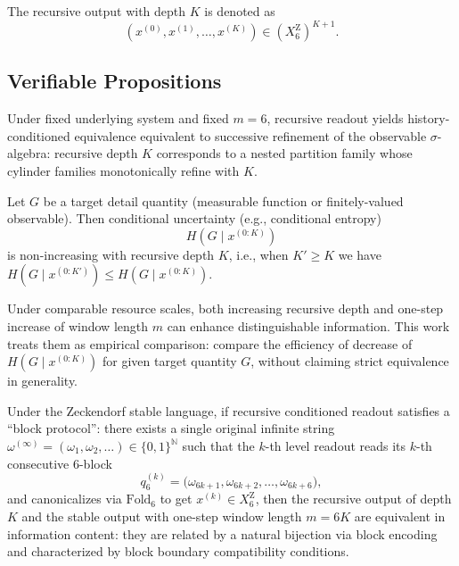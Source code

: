 \begin{definition}\label{def:recursive-output-sequence}
The recursive output with depth $K$ is denoted as
$$
(x^{(0)},x^{(1)},\dots,x^{(K)})\in (X_6^{\mathrm Z})^{K+1}.
$$
\end{definition}

\subsection{Verifiable Propositions}

\begin{proposition}\label{prop:R1-refinement}
Under fixed underlying system and fixed $m=6$, recursive readout yields history-conditioned equivalence equivalent to successive refinement of the observable $\sigma$-algebra: recursive depth $K$ corresponds to a nested partition family whose cylinder families monotonically refine with $K$.
\end{proposition}

\begin{proposition}\label{prop:R2-monotone-conditional-uncertainty}
Let $G$ be a target detail quantity (measurable function or finitely-valued observable). Then conditional uncertainty (e.g., conditional entropy)
$$
H(G\mid x^{(0:K)})
$$
is non-increasing with recursive depth $K$, i.e., when $K'\ge K$ we have $H(G\mid x^{(0:K')})\le H(G\mid x^{(0:K)})$.
\end{proposition}

\begin{proposition}\label{prop:R3-K-vs-m}
Under comparable resource scales, both increasing recursive depth and one-step increase of window length $m$ can enhance distinguishable information. This work treats them as empirical comparison: compare the efficiency of decrease of $H(G\mid x^{(0:K)})$ for given target quantity $G$, without claiming strict equivalence in generality.
\end{proposition}

\begin{proposition}\label{prop:R4-block-equivalence}
Under the Zeckendorf stable language, if recursive conditioned readout satisfies a ``block protocol'': there exists a single original infinite string $\omega^{(\infty)}=(\omega_1,\omega_2,\dots)\in\{0,1\}^{\mathbb{N}}$ such that the $k$-th level readout reads its $k$-th consecutive 6-block
\[
q_6^{(k)}=\bigl(\omega_{6k+1},\omega_{6k+2},\dots,\omega_{6k+6}\bigr),
\]
and canonicalizes via $\mathrm{Fold}_6$ to get $x^{(k)}\in X_6^{\mathrm Z}$, then the recursive output of depth $K$ and the stable output with one-step window length $m=6K$ are equivalent in information content: they are related by a natural bijection via block encoding and characterized by block boundary compatibility conditions.
\end{proposition}

